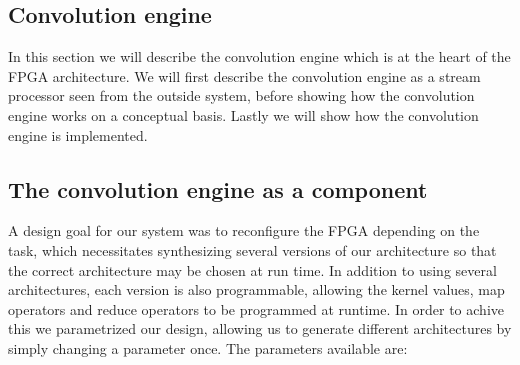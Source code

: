 \subsection{Convolution engine}
In this section we will describe the convolution engine which is at the heart of the FPGA architecture.
We will first describe the convolution engine as a stream processor seen from the outside system, before showing how the convolution engine works on a conceptual basis.
Lastly we will show how the convolution engine is implemented.

\subsection{The convolution engine as a component}
A design goal for our system was to reconfigure the FPGA depending on the task, which necessitates synthesizing several versions of our architecture so that the correct architecture may be chosen at run time.
In addition to using several architectures, each version is also programmable, allowing the kernel values, map operators and reduce operators to be programmed at runtime.
In order to achive this we parametrized our design, allowing us to generate different architectures by simply changing a parameter once.
The parameters available are:

